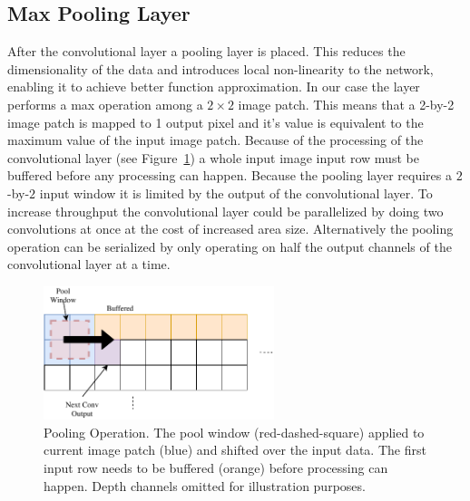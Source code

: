 \subsection{Max Pooling Layer}

After the convolutional layer a pooling layer is placed. This reduces the dimensionality of the data and introduces local non-linearity to the network, enabling it to achieve better function approximation. In our case the layer performs a max operation among a $2 \times 2$ image patch. This means that a 2-by-2 image patch is mapped to 1 output pixel and it's value is equivalent to the maximum value of the input image patch.
Because of the processing of the convolutional layer (see Figure~\ref{fig:hw-conv-operation}) a whole input image input row must be buffered before any processing can happen. Because the pooling layer requires a $2$-by-$2$ input window it is limited by the output of the convolutional layer. To increase throughput the convolutional layer could be parallelized by doing two convolutions at once at the cost of increased area size. Alternatively the pooling operation can be serialized by only operating on half the output channels of the convolutional layer at a time.

\begin{figure}[h]
	\centering
	\includegraphics[width=0.6\textwidth]{img/pool.pdf}
	\caption[Pooling Operation]{Pooling Operation. The pool window (red-dashed-square) applied to current image patch (blue) and shifted over the input data. The first input row needs to be buffered (orange) before processing can happen. Depth channels omitted for illustration purposes.}
	\label{fig:hw-conv-operation}
\end{figure}

